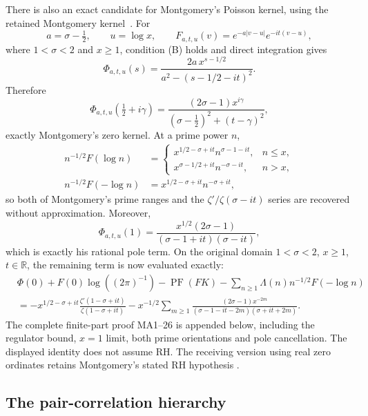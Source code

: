 There is also an exact candidate for Montgomery's Poisson kernel, using the retained
Montgomery kernel~\cite[pp.~185--187, eqs.~(18)--(22)]{montgomery1973}.  For
\[
 a=\sigma-\tfrac12,\qquad u=\log x,\qquad
 F_{a,t,u}(v)=e^{-a|v-u|}e^{-it(v-u)},
\]
where $1<\sigma<2$ and $x\geq1$, condition (B) holds and direct integration gives
\begin{equation}
 \Phi_{a,t,u}(s)=
 \frac{2a\,x^{s-1/2}}{a^2-(s-1/2-it)^2}.
 \label{eq:montgomery-weil-test}
\end{equation}
Therefore
\begin{equation}
 \Phi_{a,t,u}(\tfrac12+i\gamma)=
 \frac{(2\sigma-1)x^{i\gamma}}
 { (\sigma-\tfrac12)^2+(t-\gamma)^2},
 \label{eq:montgomery-weil-zero-kernel}
\end{equation}
exactly Montgomery's zero kernel.  At a prime power $n$,
\begin{align*}
 n^{-1/2}F(\log n)&=
 \begin{cases}
 x^{1/2-\sigma+it}n^{\sigma-1-it},&n\leq x,\\
 x^{\sigma-1/2+it}n^{-\sigma-it},&n>x,
 \end{cases}\\
 n^{-1/2}F(-\log n)&=x^{1/2-\sigma+it}n^{-\sigma+it},
\end{align*}
so both of Montgomery's prime ranges and the $\zeta'/\zeta(\sigma-it)$ series are recovered
without approximation.  Moreover,
\[
 \Phi_{a,t,u}(1)=
 \frac{x^{1/2}(2\sigma-1)}{(\sigma-1+it)(\sigma-it)},
\]
which is exactly his rational pole term.  On the original domain $1<\sigma<2$, $x\ge1$, $t\in\mathbb R$, the
remaining term is now evaluated exactly:
\[
\begin{aligned}
 &\Phi(0)+F(0)\log((2\pi)^{-1})-\operatorname{PF}(FK)
 -\sum_{n\ge1}\Lambda(n)n^{-1/2}F(-\log n)\\
 &=-x^{1/2-\sigma+it}\frac{\zeta'(1-\sigma+it)}{\zeta(1-\sigma+it)}
 -x^{-1/2}\sum_{m\ge1}
 \frac{(2\sigma-1)x^{-2m}}{(\sigma-1-it-2m)(\sigma+it+2m)}.
\end{aligned}
\]
The complete finite-part proof MA1--26 is appended below, including the
regulator bound, $x=1$ limit, both prime orientations and pole cancellation.
The displayed identity does not assume RH. The receiving version using real
zero ordinates retains Montgomery's stated RH hypothesis
\cite[pp.~185--187, equations (18)--(22)]{montgomery1973}.

\subsection{The pair-correlation hierarchy}

